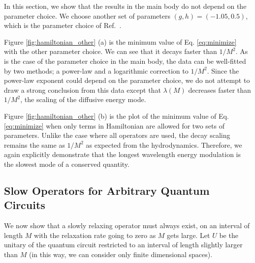\documentclass[twocolumn,superscriptaddress, prb]{revtex4-1}
\begin{document}
In this section, we show that the results in the main body do not depend on the parameter choice.
We choose another set of parameters $(g,h) = (-1.05, 0.5)$, which is the parameter choice of Ref.~.

Figure \ref{fig:hamiltonian_other} (a) is the minimum value of Eq. \eqref{eq:minimize} with the other parameter choice.
We can see that it decays faster than $1/M^2$. As is the case of the parameter choice in the main body,
the data can be well-fitted by two methods; a power-law and a logarithmic correction to $1/M^2$.
Since the power-law exponent could depend on the parameter choice, we do not attempt to draw a strong conclusion from this data
except that $\lambda(M)$ decreases faster than $1/M^2$,
the scaling of the diffusive energy mode.

Figure \ref{fig:hamiltonian_other} (b) is the plot of the minimum value of Eq. \eqref{eq:minimize} when only terms in Hamiltonian are allowed
for two sets of parameters. Unlike the case where all operators are used,
the decay scaling remains the same as $1/M^2$ as expected from the hydrodynamics.
Therefore, we again explicitly demonstrate that the longest wavelength energy modulation is the slowest mode of a conserved quantity.


%

\subsection{Slow Operators for Arbitrary Quantum Circuits}
We now show that a slowly relaxing operator must always exist, on an interval of length $M$ with the relaxation rate going to zero as $M$ gets large.  Let $U$ be the unitary of the quantum circuit restricted to an interval of length slightly larger than $M$ (in this way, we can consider only finite dimensional spaces).
\end{document}
